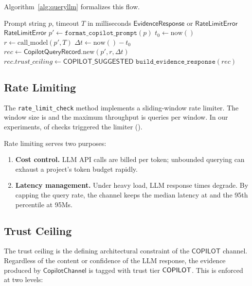 \documentclass[11pt]{article}
\newcommand{\CopCh}{\mathsf{CopilotChannel}}
\newcommand{\QRec}{\mathsf{CopilotQueryRecord}}
\newcommand{\TrustCeil}{\mathsf{COPILOT\_SUGGESTED}}
\newcommand{\queryLLM}{\texttt{query\_llm}}
\newcommand{\rateCheck}{\texttt{rate\_limit\_check}}
\newcommand{\buildResp}{\texttt{build\_evidence\_response}}
\newcommand{\fmtPrompt}{\texttt{format\_copilot\_prompt}}
\begin{document}
Algorithm~\ref{alg:queryllm} formalizes this flow.

\begin{algorithm}[ht]
\caption{$\queryLLM(\mathit{prompt}, \mathit{timeout\_ms})$}
\label{alg:queryllm}
\begin{algorithmic}[1]
\REQUIRE Prompt string $p$, timeout $T$ in milliseconds
\ENSURE $\mathsf{EvidenceResponse}$ or $\mathsf{RateLimitError}$
\IF{$\neg\;\rateCheck()$}
  \RETURN $\mathsf{RateLimitError}$
\ENDIF
\STATE $p' \gets \fmtPrompt(p)$
\STATE $t_0 \gets \mathrm{now}()$
\STATE $r \gets \mathrm{call\_model}(p', T)$
\STATE $\Delta t \gets \mathrm{now}() - t_0$
\STATE $\mathit{rec} \gets \QRec.\mathrm{new}(p', r, \Delta t)$
\STATE $\mathit{rec}.\mathit{trust\_ceiling} \gets \TrustCeil$
\RETURN $\buildResp(\mathit{rec})$
\end{algorithmic}
\end{algorithm}

\subsection{Rate Limiting}
\label{sec:copilot:ratelimit}

The \rateCheck{} method implements a sliding-window rate limiter.
The window size is \ppLXXXVIIIrateLimitWindow{} and the maximum
throughput is \ppLXXXVIIIrateLimitMaxQps{} queries per window.
In our experiments, \ppLXXXVIIIrateLimitHits{} of
\ppLXXXVIIIrateLimitChecks{} checks triggered the limiter
(\ppLXXXVIIIrateLimitHitPct).

Rate limiting serves two purposes:

\begin{enumerate}
\item \textbf{Cost control.}
  LLM API calls are billed per token; unbounded querying can
  exhaust a project's token budget rapidly.

\item \textbf{Latency management.}
  Under heavy load, LLM response times degrade.  By capping
  the query rate, the channel keeps the median latency at
  \ppLXXXVIIIlatencyMedianMs{} and the 95th percentile at
  \ppLXXXVIIIlatencyP95Ms.
\end{enumerate}

\subsection{Trust Ceiling}
\label{sec:copilot:ceiling}

The trust ceiling is the defining architectural constraint of the
$\mathsf{COPILOT}$ channel.  Regardless of the content or
confidence of the LLM response, the evidence produced by $\CopCh$
is tagged with trust tier $\mathsf{COPILOT}$.  This is enforced at two
levels:
\end{document}
